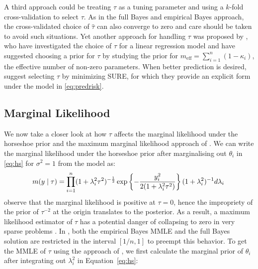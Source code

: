 \documentclass[sts,preprint]{imsart}
\begin{document}

A third approach could be treating $\tau$ as a tuning parameter and using a $k$-fold cross-validation to select $\tau$.  As in the full Bayes and empirical Bayes approach, the cross-validated choice of $\hat{\tau}$ can also converge to zero and care should be taken to avoid such situations. Yet another
approach for handling $\tau$ was proposed by \citet{piironen2016hyperprior}, who have investigated the choice of $\tau$ for a linear regression model and have suggested choosing a prior for $\tau$ by studying the prior for $m_{\text{eff}} = \sum_{i=1}^{n} (1-\kappa_i)$, the effective number of non-zero parameters. When better prediction is desired, \citet{bhadra2016prediction} suggest selecting $\tau$ by minimizing SURE, for which they provide an explicit form under the model in \eqref{eq:predrisk}. 

\subsection{Marginal Likelihood}
We now take a closer look at how $\tau$ affects the marginal likelihood under the horseshoe prior and the maximum marginal likelihood approach of \cite{van2017adaptive}. We can write the marginal likelihood under the horseshoe prior after marginalising out $\theta_i$ in \eqref{eq:hs} for $\sigma^2 = 1$ from the model as:
\[
  m(y \mid \tau) = \prod_{i=1}^{n} (1+\lambda_i^2 \tau^2)^{-\frac{1}{2}} \exp \left \{ - \frac{y_i^2}{2(1+\lambda_i^2 \tau^2)} \right \}  (1+\lambda_i^2)^{-1} d \lambda_i \;
\]
\citet{tiao1965bayesian} observe that the marginal likelihood is positive at $\tau = 0$, hence the impropriety of the prior of $\tau^{-2}$ at the origin translates to the posterior. As a result, a maximum likelihood estimator of $\tau$ has a potential danger of collapsing to zero in very sparse problems \citep{polson2010shrink, datta2013asymptotic}. In \cite{van2017adaptive}, both the empirical Bayes MMLE and the full Bayes solution are restricted in the interval $[1/n,1]$ to preempt this behavior. To get the MMLE of $\tau$ using the approach of \cite{van2017adaptive}, we first calculate the marginal prior of $\theta_i$ after integrating out $\lambda_i^2$ in Equation~\eqref{eq:hs}:
\end{document}
